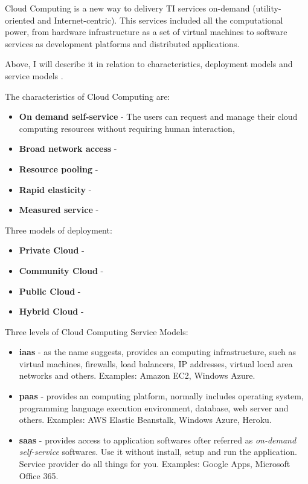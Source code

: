 Cloud Computing is a new way to delivery TI services on-demand (utility-oriented and Internet-centric). This services included all the computational power, from hardware infrastructure as a set of virtual machines to software services as development platforms and distributed applications.

Above, I will describe it in relation to characteristics, deployment models and service models \cite{schouten2013ibm}.

The characteristics of Cloud Computing are:
\begin{itemize}
	\item \textbf{On demand self-service} 	- The users can request and manage their cloud computing resources without requiring human interaction,
	\item \textbf{Broad network access 	}	-
	\item \textbf{Resource pooling 		}	-
	\item \textbf{Rapid elasticity 		}	-
	\item \textbf{Measured service 		}	-
\end{itemize}

Three models of deployment:
\begin{itemize}
	\item \textbf{Private Cloud}   -
	\item \textbf{Community Cloud} -
	\item \textbf{Public Cloud}    -
	\item \textbf{Hybrid Cloud}    -
\end{itemize}

Three levels of Cloud Computing Service Models:

\begin{itemize}
	\item \textbf{\ac{iaas}} - as the name suggests, provides an computing infrastructure, such as virtual machines, firewalls, load balancers, IP addresses, virtual local area networks and others. Examples: Amazon EC2, Windows Azure.

	\item \textbf{\ac{paas}} - provides an computing platform, normally includes operating system, programming language execution environment, database, web server and others. Examples: AWS Elastic Beanstalk, Windows Azure, Heroku.

	\item \textbf{\ac{saas}} - provides access to application softwares ofter referred as \textit{on-demand self-service} softwares. Use it without install, setup and run the application. Service provider do all things for you. Examples: Google Apps, Microsoft Office 365.

\end{itemize}

